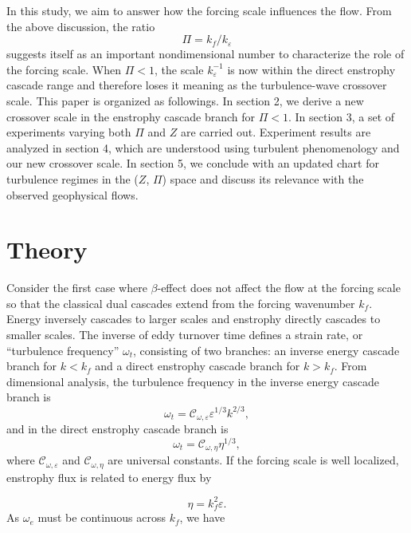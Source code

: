 \documentclass{ametsoc}
\begin{document}
In this study, we aim to answer how the forcing scale influences the
flow. From the above discussion, the ratio
\begin{equation}
\Pi=k_{f}/k_{\varepsilon}\label{eq:def_Pi_index}
\end{equation}
suggests itself as an important nondimensional number to characterize
the role of the forcing scale. When $\Pi<1$, the scale $k_{\varepsilon}^{-1}$
is now within the direct enstrophy cascade range and therefore loses
it meaning as the turbulence-wave crossover scale. This paper is organized
as followings. In section 2, we derive a new crossover scale in the
enstrophy cascade branch for $\Pi<1$. In section 3, a set of experiments
varying both $\Pi$ and $Z$ are carried out. Experiment results are
analyzed in section 4, which are understood using turbulent phenomenology
and our new crossover scale. In section 5, we conclude with an updated
chart for turbulence regimes in the ($Z$, $\Pi$) space and discuss
its relevance with the observed geophysical flows.


\section{Theory}

Consider the first case where $\beta$-effect does not affect the flow at the forcing
scale so that the classical dual cascades extend from the forcing
wavenumber $k_{f}$. Energy inversely cascades to larger scales and
enstrophy directly cascades to smaller scales. The inverse of eddy
turnover time defines a strain rate, or ``turbulence frequency''
$\omega_{t}$, consisting of two branches: an inverse energy cascade
branch for $k<k_{f}$ and a direct enstrophy cascade branch for $k>k_{f}$.
From dimensional analysis, the turbulence frequency in the inverse
energy cascade branch is
\begin{equation}
\omega_{t}=\mathcal{C}_{\omega,\varepsilon}\varepsilon^{1/3}k^{2/3},\label{eq:eddy_turnover_freq_inverse_cascade}
\end{equation}
and in the direct enstrophy cascade branch is
\begin{equation}
\omega_{t}=\mathcal{C}_{\omega,\eta}\eta^{1/3},\label{eq:eddy_turnover_freq_direct_enstrophy_cascade}
\end{equation}
where $\mathcal{C}_{\omega,\varepsilon}$ and $\mathcal{C}_{\omega,\eta}$
are universal constants. If the forcing scale is well localized, enstrophy
flux is related to energy flux by

\begin{equation}
\eta=k_{f}^{2}\varepsilon.\label{eq:energy_enstrophy_flux_relationship}
\end{equation}
As $\omega_{e}$ must be continuous across $k_{f}$, we have
\end{document}
